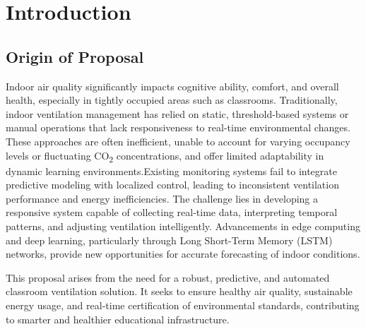 \chapter{Introduction}

\section{Origin of Proposal}
Indoor air quality significantly impacts cognitive ability, comfort, and overall health, especially in tightly occupied areas such as classrooms. Traditionally, indoor ventilation management has relied on static, threshold-based systems or manual operations that lack responsiveness to real-time environmental changes. These approaches are often inefficient, unable to account for varying occupancy levels or fluctuating CO\textsubscript{2} concentrations, and offer limited adaptability in dynamic learning environments.Existing monitoring systems fail to integrate predictive modeling with localized control, leading to inconsistent ventilation performance and energy inefficiencies. The challenge lies in developing a responsive system capable of collecting real-time data, interpreting temporal patterns, and adjusting ventilation intelligently. Advancements in edge computing and deep learning, particularly through Long Short-Term Memory (LSTM) networks, provide new opportunities for accurate forecasting of indoor conditions.

This proposal arises from the need for a robust, predictive, and automated classroom ventilation solution. It seeks to ensure healthy air quality, sustainable energy usage, and real-time certification of environmental standards, contributing to smarter and healthier educational infrastructure.

